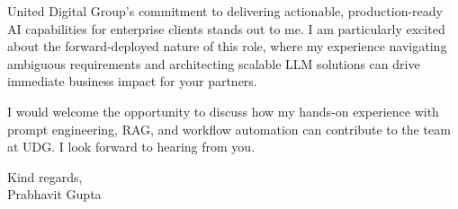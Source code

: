 \documentclass[11pt,a4paper]{article}
\begin{document}
United Digital Group's commitment to delivering actionable, production-ready AI capabilities for enterprise clients stands out to me. I am particularly excited about the forward-deployed nature of this role, where my experience navigating ambiguous requirements and architecting scalable LLM solutions can drive immediate business impact for your partners.


I would welcome the opportunity to discuss how my hands-on experience with prompt engineering, RAG, and workflow automation can contribute to the team at UDG. I look forward to hearing from you.


\begin{flushright}
Kind regards, \\[3ex]


Prabhavit Gupta

\end{flushright}
\end{document}
